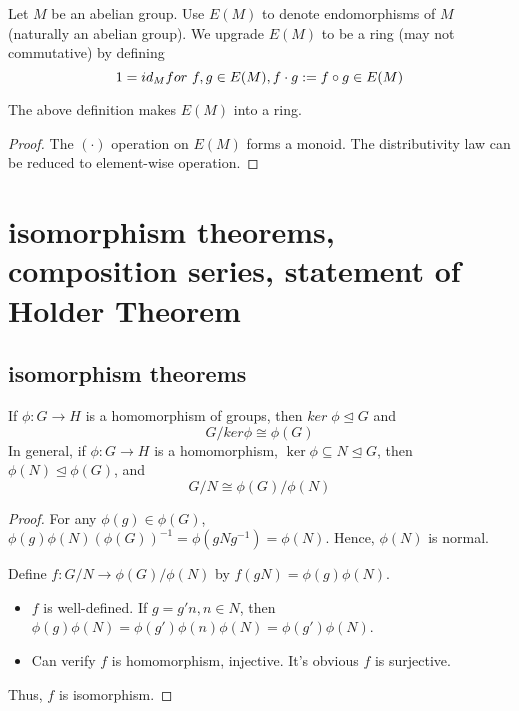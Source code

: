 \documentclass[11pt,fleqn]{book} %
\begin{document}
\begin{CJK}{UTF8}{gkai}
\begin{definition}
	 Let $M$ be an abelian group. Use $E(M)$ to denote endomorphisms of $M$ (naturally an abelian group). We upgrade $E(M)$ to be a ring (may not commutative) by defining 
	\[
		1 = id_M \\
		for \ f,g \in E(M), f\cdot g := f\circ g \in E(M)\]
\end{definition}
\begin{proposition}
	The above definition makes $E(M)$ into a ring.	
\end{proposition}
\begin{proof}
	The $(\cdot)$ operation on $E(M)$ forms a monoid. The distributivity law can be reduced to element-wise operation.
\end{proof}

\section{isomorphism theorems, composition series, statement of Holder Theorem}
\subsection{isomorphism theorems}

\begin{theorem}
	 If $\phi: G \to H$ is a homomorphism of groups, then $ker \; \phi \unlhd G$ and \[
		G / ker \phi \cong \phi(G) \]
	In general, if $\phi: G\to H$ is a homomorphism, $\ker \phi \subseteq N \trianglelefteq G$, then $\phi(N) \unlhd \phi(G)$, and 
	\[
		G/N \cong \phi(G)/\phi(N)\]
\end{theorem}
\begin{proof}
	For any $\phi(g) \in \phi(G)$, $\phi(g)\phi(N)(\phi(G))^{-1} = \phi(gNg^{-1}) = \phi(N)$. Hence, $\phi(N)$ is normal.
	
	Define $f: G/N \to \phi(G) / \phi(N)$ by $f(gN) = \phi(g)\phi(N)$. 

	\begin{itemize}
		\item $f$ is well-defined. If $g = g'n, n \in N$, then $\phi(g)\phi(N) = \phi(g')\phi(n)\phi(N) = \phi(g')\phi(N)$.
		\item Can verify $f$ is homomorphism, injective. It's obvious $f$ is surjective.
	\end{itemize}
	Thus, $f$ is isomorphism.
\end{proof}


\end{CJK}
\end{document}
